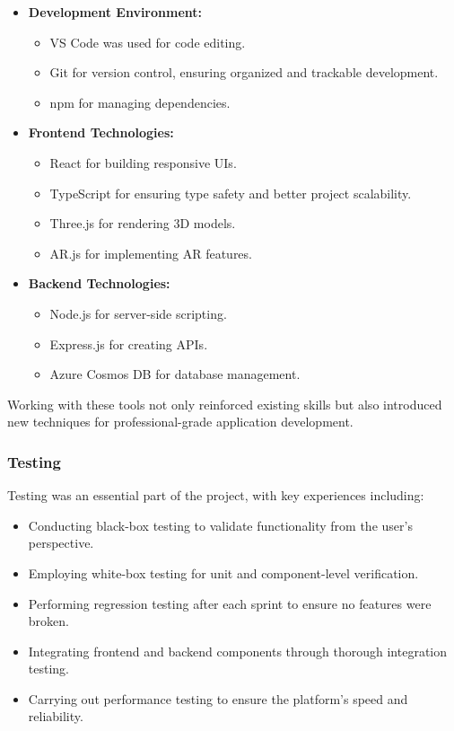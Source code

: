 \documentclass{article}
\begin{document}
\begin{itemize}
    \item \textbf{Development Environment:}
    \begin{itemize}
        \item VS Code was used for code editing.
        \item Git for version control, ensuring organized and trackable development.
        \item npm for managing dependencies.
    \end{itemize}
    
    \item \textbf{Frontend Technologies:}
    \begin{itemize}
        \item React for building responsive UIs.
        \item TypeScript for ensuring type safety and better project scalability.
        \item Three.js for rendering 3D models.
        \item AR.js for implementing AR features.
    \end{itemize}
    
    \item \textbf{Backend Technologies:}
    \begin{itemize}
        \item Node.js for server-side scripting.
        \item Express.js for creating APIs.
        \item Azure Cosmos DB for database management.
    \end{itemize}
\end{itemize}

Working with these tools not only reinforced existing skills but also introduced new techniques for professional-grade application development.

\subsubsection{Testing}
Testing was an essential part of the project, with key experiences including:

\begin{itemize}
    \item Conducting black-box testing to validate functionality from the user's perspective.
    \item Employing white-box testing for unit and component-level verification.
    \item Performing regression testing after each sprint to ensure no features were broken.
    \item Integrating frontend and backend components through thorough integration testing.
    \item Carrying out performance testing to ensure the platform's speed and reliability.
\end{itemize}
\end{document}
